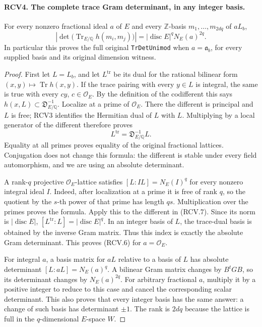 \documentclass[11pt,a4paper]{article}
\numberwithin{equation}{section}
\theoremstyle{remark}\newtheorem{remark}[theorem]{Remark}
\begin{document}
\paragraph{RCV4. The complete trace Gram determinant, in any integer basis.}
\label{claim:RCV4}
For every nonzero fractional ideal \(a\) of \(E\) and every
\(\mathbb Z\)-basis \(m_1,\ldots,m_{2dq}\) of \(aL_b\),
\[
 \left|\det\big(\operatorname{Tr}_{E/\mathbb Q}
                         h(m_i,m_j)\big)\right|
       =|\operatorname{disc}E|^q N_E(a)^{2q}.
\tag{RCV.6}
\]
In particular this proves the full original \texttt{Tr\allowbreak Det\allowbreak Unimod}
when \(a=\mathfrak a_b\), for every supplied basis and its original
dimension witness.
\begin{proof}
First let \(L=L_b\), and let \(L^{\mathrm{tr}}\) be its dual for
the rational bilinear form \((x,y)\mapsto\operatorname{Tr}h(x,y)\).
If the trace pairing with every \(y\in L\) is integral, the same
is true with every \(cy\), \(c\in\mathcal O_E\).  By the
definition of the codifferent this says
\(h(x,L)\subset\mathfrak D_{E/\mathbb Q}^{-1}\).  Localize
at a prime of \(\mathcal O_E\).  There the different is principal
and \(L\) is free; RCV3 identifies the Hermitian dual of \(L\)
with \(L\).  Multiplying by a local generator of the different
therefore proves
\[
           L^{\mathrm{tr}}=\mathfrak D_{E/\mathbb Q}^{-1}L.
\tag{RCV.7}
\]
Equality at all primes proves equality of the original fractional
lattices.  Conjugation does not change this formula: the different
is stable under every field automorphism, and we are using an
absolute determinant.

A rank-\(q\) projective \(\mathcal O_E\)-lattice satisfies
\([L:IL]=N_E(I)^q\) for every nonzero integral ideal \(I\).
Indeed, after localization at a prime it is free of rank \(q\),
so the quotient by the \(s\)-th power of that prime has length
\(qs\).  Multiplication over the primes proves the formula.
Apply this to the different in (RCV.7).  Since its norm is
\(|\operatorname{disc}E|\),
\([L^{\mathrm{tr}}:L]=|\operatorname{disc}E|^q\).
In an integer basis of \(L\), the trace-dual basis is obtained
by the inverse Gram matrix.  Thus this index is exactly the
absolute Gram determinant.  This proves (RCV.6) for \(a=\mathcal O_E\).

For integral \(a\), a basis matrix for \(aL\) relative to a
basis of \(L\) has absolute determinant \([L:aL]=N_E(a)^q\).
A bilinear Gram matrix changes by \(B^tGB\), so its determinant
changes by \(N_E(a)^{2q}\).  For arbitrary fractional \(a\),
multiply it by a positive integer to reduce to this case and
cancel the corresponding scalar determinant.  This also proves
that every integer basis has the same answer: a change of such
basis has determinant \(\pm1\).  The rank is \(2dq\) because
the lattice is full in the \(q\)-dimensional \(E\)-space \(W\).
\end{proof}
\end{document}

